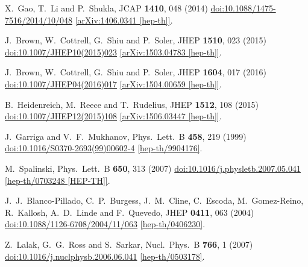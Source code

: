 \documentclass[12pt]{article}
\begin{document}
\begin{thebibliography}{99}
  X.~Gao, T.~Li and P.~Shukla,
  JCAP {\bf 1410}, 048 (2014)
  \href{https://dx.doi.org/10.1088/1475-7516/2014/10/048}{doi:10.1088/1475-7516/2014/10/048}
  \href{https://arxiv.org/abs/1406.0341}{[arXiv:1406.0341 [hep-th]]}.

  J.~Brown, W.~Cottrell, G.~Shiu and P.~Soler,
  JHEP {\bf 1510}, 023 (2015)
  \href{https://dx.doi.org/10.1007/JHEP10(2015)023}{doi:10.1007/JHEP10(2015)023}
  \href{https://arxiv.org/abs/1503.04783}{[arXiv:1503.04783 [hep-th]]}.

  J.~Brown, W.~Cottrell, G.~Shiu and P.~Soler,
  JHEP {\bf 1604}, 017 (2016)
  \href{https://dx.doi.org/10.1007/JHEP04(2016)017}{doi:10.1007/JHEP04(2016)017}
  \href{https://arxiv.org/abs/1504.00659}{[arXiv:1504.00659 [hep-th]]}.

  B.~Heidenreich, M.~Reece and T.~Rudelius,
  JHEP {\bf 1512}, 108 (2015)
  \href{https://dx.doi.org/10.1007/JHEP12(2015)108}{doi:10.1007/JHEP12(2015)108}
  \href{https://arxiv.org/abs/1506.03447}{[arXiv:1506.03447 [hep-th]]}.

  J.~Garriga and V.~F.~Mukhanov,
  Phys.\ Lett.\ B {\bf 458}, 219 (1999)
  \href{https://dx.doi.org/10.1016/S0370-2693(99)00602-4}{doi:10.1016/S0370-2693(99)00602-4}
  \href{https://arxiv.org/abs/hep-th/9904176}{[hep-th/9904176]}.

  M.~Spalinski,
  Phys.\ Lett.\ B {\bf 650}, 313 (2007)
  \href{https://dx.doi.org/10.1016/j.physletb.2007.05.041}{doi:10.1016/j.physletb.2007.05.041}
  \href{https://arxiv.org/abs/hep-th/0703248}{[hep-th/0703248 [HEP-TH]]}.

  J.~J.~Blanco-Pillado, C.~P.~Burgess, J.~M.~Cline, C.~Escoda, M.~Gomez-Reino, R.~Kallosh, A.~D.~Linde and F.~Quevedo,
  JHEP {\bf 0411}, 063 (2004)
  \href{https://dx.doi.org/10.1088/1126-6708/2004/11/063}{doi:10.1088/1126-6708/2004/11/063}
  \href{https://arxiv.org/abs/hep-th/0406230}{[hep-th/0406230]}.

  Z.~Lalak, G.~G.~Ross and S.~Sarkar,
  Nucl.\ Phys.\ B {\bf 766}, 1 (2007)
  \href{https://dx.doi.org/10.1016/j.nuclphysb.2006.06.041}{doi:10.1016/j.nuclphysb.2006.06.041}
  \href{https://arxiv.org/abs/hep-th/0503178}{[hep-th/0503178]}.


\end{thebibliography}
\end{document}
